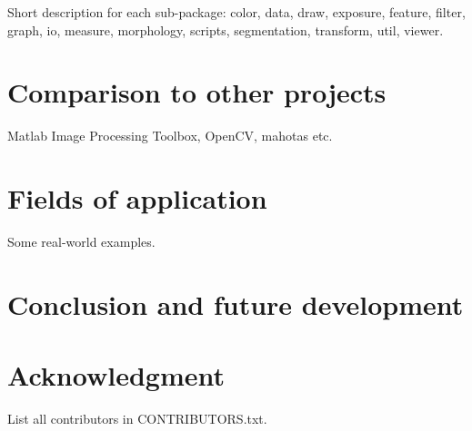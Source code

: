 Short description for each sub-package: color, data, draw, exposure, feature, filter, graph, io, measure, morphology, scripts, segmentation, transform, util, viewer.

\section{Comparison to other projects}

Matlab Image Processing Toolbox, OpenCV, mahotas etc.

\section{Fields of application}

Some real-world examples.

\section{Conclusion and future development}

\section{Acknowledgment}

List all contributors in CONTRIBUTORS.txt.


\nocite{*}


